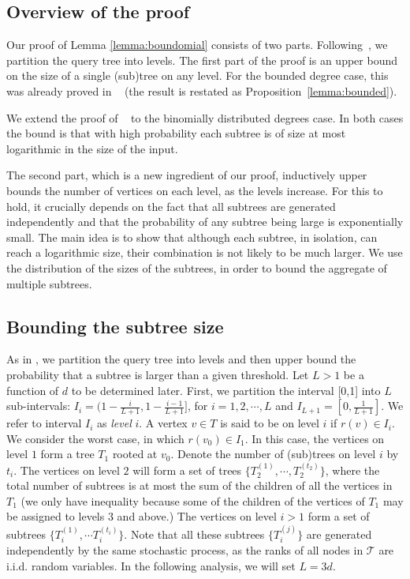 \documentclass[english, oribibl]{llncs}
\newcommand{\mygamma}{L}
\begin{document}
\subsection{Overview of the proof}

Our proof of Lemma \ref{lemma:boundomial} consists of two parts. Following~\cite{ARV+11}, we partition the query tree into levels.
The first part of the proof is an upper bound on the size of a single (sub)tree on any level.
For the bounded degree case, this was already proved in ~\cite{ARV+11} (the result is restated as Proposition~\ref{lemma:bounded}).




We extend the proof of ~\cite{ARV+11} to the binomially distributed degrees case. In both cases the bound is that with high probability each subtree is of size at most logarithmic in the size of the input.

The second part, which is a new ingredient of our proof,
inductively upper bounds the number of vertices on each level, as the levels increase.
For this to hold, it crucially depends on the fact that all subtrees are generated independently and that the probability of any subtree being large is exponentially small.
The main idea is to show that although each subtree, in isolation, can reach a logarithmic size, their combination is not likely to be much larger. We use the distribution of the sizes of the subtrees, in order to bound the aggregate of multiple subtrees.





\subsection{Bounding the subtree size}



As in \cite{ARV+11}, we partition the query tree into levels and then upper bound
the probability that a subtree is larger than a given threshold.
Let $\mygamma>1$ be a function of $d$ to be determined later.
First, we partition the interval [0,1] into $\mygamma$ sub-intervals:
$I_i = (1-\frac{i}{\mygamma+1}, 1-\frac{i-1}{\mygamma+1}]$,
for $i=1,2,\cdots, \mygamma$ and $I_{\mygamma+1} = [0, \frac{1}{\mygamma+1}]$.
We refer to interval $I_i$ as \emph{level} $i$.
A vertex $v \in T$ is said to be on level $i$ if $r(v) \in I_i$.
We consider the worst case, in which $r(v_0) \in I_1$.
In this case, the vertices on level $1$ form a tree $T_1$ rooted at $v_0$.
Denote the number of (sub)trees on level $i$  by $t_i$.
The vertices on level $2$ will form a set of trees $\{T_2^{(1)}, \cdots, T_2^{(t_2)}\}$,
where the total number of subtrees is at most the sum of the children of all the vertices in $T_1$
(we only have inequality because some of the children of the vertices of $T_1$
may be assigned to levels $3$ and above.)
The vertices on level $i>1$ form a set of subtrees $\{T_i^{(1)}, \cdots T_i^{(t_{i})}\}$.
Note that all these subtrees $\{T_{i}^{(j)}\}$ are generated independently by the same stochastic process, as the ranks of all nodes in $\mathcal{T}$ are i.i.d. random variables. In the following analysis, we will set $\mygamma = 3d$.
\end{document}
